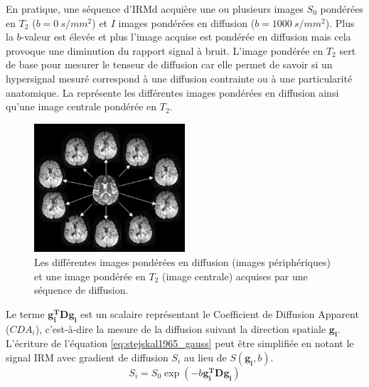 En pratique, une séquence d'IRMd acquière une ou plusieurs images $S_0$ pondérées en $T_2$ ($b=0\ s/mm^2$) et 
$I$ images pondérées en diffusion ($b=1000\ s/mm^2$).
Plus la $b$-valeur est élevée et plus l'image acquise est pondérée en diffusion 
mais cela provoque une diminution du rapport signal à bruit.
L'image pondérée en $T_2$ sert de base pour mesurer le tenseur de diffusion 
car elle permet de savoir si un hypersignal mesuré correspond à une diffusion contrainte ou à une particularité anatomique.
La  représente les différentes images pondérées en diffusion ainsi qu'une image centrale pondérée en $T_2$.

\begin{figure}[ht]
    \centering
    \includegraphics[width=0.5\textwidth]{Images/gradients.pdf}
    \caption{\label{fig:gradients}Les différentes images pondérées en diffusion (images périphériques) 
    et une image pondérée en $T_2$ (image centrale) acquises par une séquence de diffusion.}
\end{figure}

Le terme $\mathbf{g_i^T}\mathbf{D}\mathbf{g_i}$ est un scalaire représentant le Coefficient de Diffusion Apparent ($CDA_i$),
c'est-à-dire la mesure de la diffusion suivant la direction spatiale $\mathbf{g_i}$.
L'écriture de l'équation \eqref{eq:stejskal1965_gauss} peut être simplifiée en notant le signal IRM 
avec gradient de diffusion $S_i$ au lieu de $S(\mathbf{g_i}, b)$.
\begin{equation}
    S_i = S_0 \exp\left( -b \mathbf{g_i^T}\mathbf{D}\mathbf{g_i}\right)
    \label{eq:stejskal1965_simple}
\end{equation}


